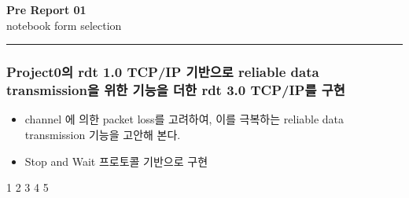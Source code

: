 \documentclass[a4paper]{article}
\begin{document}
\begin{center}\vspace{-1.5cm}
\textbf{\huge Pre Report 01}\\ [0.1cm] 
{\large notebook form selection}\\           

\end{center}
\vspace{-5mm}
\rule{\linewidth}{0.3mm}
\vspace{-3mm}
    \begin{mdframed}[
    backgroundcolor = gray!20 
    ] 
    \vspace{-5mm}
    \begin{center}
        \subsubsection*{Project0의 rdt 1.0 TCP/IP 기반으로 reliable data transmission을 위한 기능을 더한
                        rdt 3.0 TCP/IP를 구현}
            \vspace{-2mm}
            \begin{itemize}
                \item {\small 
                channel 에 의한 packet loss를 고려하여, 이를 극복하는 reliable data transmission 기능을 고안해 본다.
                }
                \vspace{-3mm}
                \item  {\small 
                Stop and Wait 프로토콜 기반으로 구현
                }
            \end{itemize}
        \end{center}
    \end{mdframed}
\vspace{-5mm}


{1}
{2}
{3}
{4}
{5}
\end{document}
